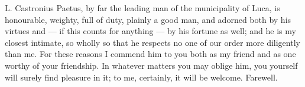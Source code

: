 

 L. Castronius Paetus, by far the leading man of the municipality of Luca, is honourable, weighty, full of duty, plainly a good man, and adorned both by his virtues and --- if this counts for anything --- by his fortune as well; and he is my closest intimate, so wholly so that he respects no one of our order more diligently than me. For these reasons I commend him to you both as my friend and as one worthy of your friendship. In whatever matters you may oblige him, you yourself will surely find pleasure in it; to me, certainly, it will be welcome. Farewell.
